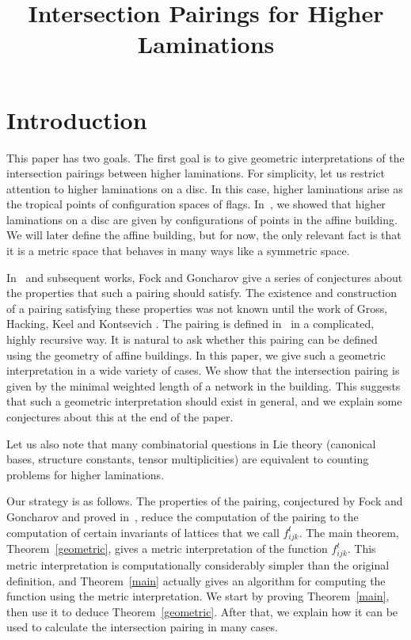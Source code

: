 \documentclass[ALCO,ThmDefs,Unicode,epreuves]{cedram}
\author{\firstname{Ian} \lastname{Le}}
\title{Intersection Pairings for Higher Laminations}
\begin{document}



\maketitle


\section{Introduction}

This paper has two goals. The first goal is to give geometric interpretations of the intersection pairings between higher laminations. For simplicity, let us restrict attention to higher laminations on a disc. In this case, higher laminations arise as the tropical points of configuration spaces of flags. In~\cite{Le}, we showed that higher laminations on a disc are given by configurations of points in the affine building. We will later define the affine building, but for now, the only relevant fact is that it is a metric space that behaves in many ways like a symmetric space.

In~\cite{FG1} and subsequent works, Fock and Goncharov give a series of conjectures about the properties that such a pairing should satisfy. The existence and construction of a pairing satisfying these properties was not known until the work of Gross, Hacking, Keel and Kontsevich \cite{GHKK}. The pairing is defined in~\cite{GHKK} in a complicated, highly recursive way. It is natural to ask whether this pairing can be defined using the geometry of affine buildings. In this paper, we give such a geometric interpretation in a wide variety of cases. We show that the intersection pairing is given by the minimal weighted length of a network in the building. This suggests that such a geometric interpretation should exist in general, and we explain some conjectures about this at the end of the paper.

Let us also note that many combinatorial questions in Lie theory (canonical bases, structure constants, tensor multiplicities) are equivalent to counting problems for higher laminations.

Our strategy is as follows. The properties of the pairing, conjectured by Fock and Goncharov and proved in~\cite{GHKK}, reduce the computation of the pairing to the computation of certain invariants of lattices that we call $f_{ijk}^t$. The main theorem, Theorem~\ref{geometric}, gives a metric interpretation of the function $f_{ijk}^t$. This metric interpretation is computationally considerably simpler than the original definition, and Theorem~\ref{main} actually gives an algorithm for computing the function using the metric interpretation. We start by proving Theorem~\ref{main}, then use it to deduce Theorem~\ref{geometric}. After that, we explain how it can be used to calculate the intersection pairing in many cases.
\end{document}
